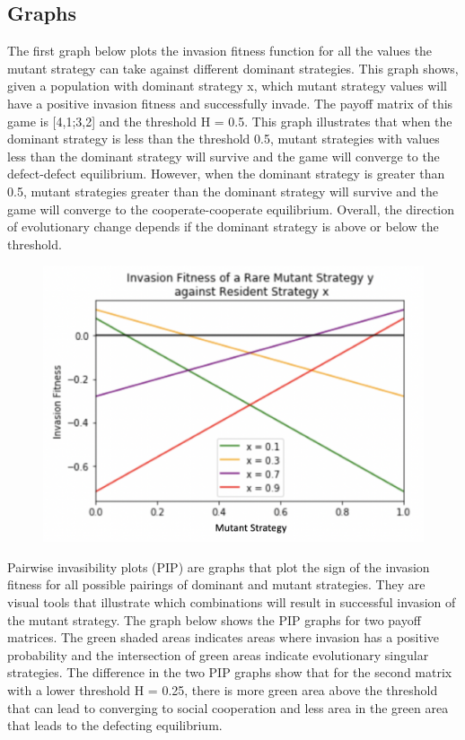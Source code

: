 \documentclass[]{llncs}
\begin{document}
\subsection{Graphs}

The first graph below plots the invasion fitness function for all the values the mutant strategy can take against different dominant strategies. This graph shows, given a population with dominant strategy x, which mutant strategy values will have a positive invasion fitness and successfully invade. The payoff matrix of this game is [4,1;3,2] and the threshold H = 0.5. This graph illustrates that when the dominant strategy is less than the threshold 0.5, mutant strategies with values less than the dominant strategy will survive and the game will converge to the defect-defect equilibrium. However, when the dominant strategy is greater than 0.5, mutant strategies greater than the dominant strategy will survive and the game will converge to the cooperate-cooperate equilibrium. Overall, the direction of evolutionary change depends if the dominant strategy is above or below the threshold. \\

\begin{figure}
\centering
\includegraphics[width=12cm]{images/inv_fit_basic}
\end{figure}

Pairwise invasibility plots (PIP) are graphs that plot the sign of the invasion fitness for all possible pairings of dominant and mutant strategies. They are visual tools that illustrate which combinations will result in successful invasion of the mutant strategy. The graph below shows the PIP graphs for two payoff matrices. The green shaded areas indicates areas where invasion has a positive probability and the intersection of green areas indicate evolutionary singular strategies. The difference in the two PIP graphs show that for the second matrix with a lower threshold H = 0.25, there is more green area above the threshold that can lead to converging to social cooperation and less area in the green area that leads to the defecting equilibrium. 
\end{document}
